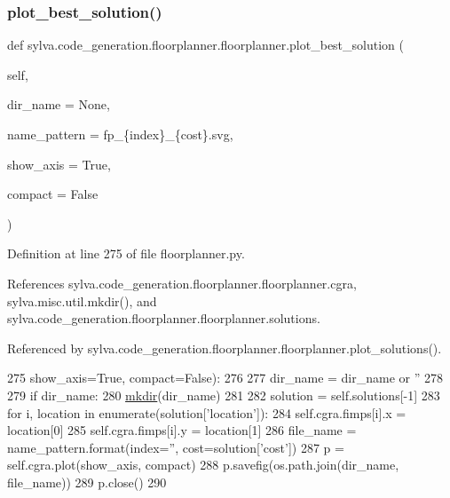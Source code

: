 \subsubsection{\texorpdfstring{plot\+\_\+best\+\_\+solution()}{plot\_best\_solution()}}
{\footnotesize\ttfamily def sylva.\+code\+\_\+generation.\+floorplanner.\+floorplanner.\+plot\+\_\+best\+\_\+solution (\begin{DoxyParamCaption}\item[{}]{self,  }\item[{}]{dir\+\_\+name = {\ttfamily None},  }\item[{}]{name\+\_\+pattern = {\ttfamily \textquotesingle{}fp\+\_\+\{index\}\+\_\+\{cost\}.svg\textquotesingle{}},  }\item[{}]{show\+\_\+axis = {\ttfamily True},  }\item[{}]{compact = {\ttfamily False} }\end{DoxyParamCaption})}



Definition at line 275 of file floorplanner.\+py.



References sylva.\+code\+\_\+generation.\+floorplanner.\+floorplanner.\+cgra, sylva.\+misc.\+util.\+mkdir(), and sylva.\+code\+\_\+generation.\+floorplanner.\+floorplanner.\+solutions.



Referenced by sylva.\+code\+\_\+generation.\+floorplanner.\+floorplanner.\+plot\+\_\+solutions().


\begin{DoxyCode}
275                            show\_axis=\textcolor{keyword}{True}, compact=\textcolor{keyword}{False}):
276 
277         dir\_name = dir\_name \textcolor{keywordflow}{or} \textcolor{stringliteral}{''}
278 
279         \textcolor{keywordflow}{if} dir\_name:
280             \hyperlink{namespacesylva_1_1misc_1_1util_af426e429c40209bbb46e3a0e8f139a44}{mkdir}(dir\_name)
281 
282         solution = self.solutions[-1]
283         \textcolor{keywordflow}{for} i, location \textcolor{keywordflow}{in} enumerate(solution[\textcolor{stringliteral}{'location'}]):
284             self.cgra.fimps[i].x = location[0]
285             self.cgra.fimps[i].y = location[1]
286         file\_name = name\_pattern.format(index=\textcolor{stringliteral}{''}, cost=solution[\textcolor{stringliteral}{'cost'}])
287         p = self.cgra.plot(show\_axis, compact)
288         p.savefig(os.path.join(dir\_name, file\_name))
289         p.close()
290 
\end{DoxyCode}
\mbox{\label{classsylva_1_1code__generation_1_1floorplanner_1_1floorplanner_a9a77944b379401d7be62164312b29721}} 
